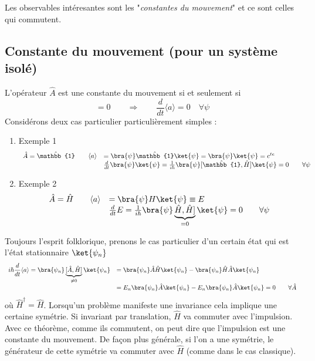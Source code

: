 	Les observables intéresantes sont les "\textit{constantes du mouvement}" et ce sont celles 
	qui commutent.

	\subsection{Constante du mouvement (pour un système isolé)}
	L'opérateur $\hat{A}$ est une constante du mouvement si et seulement si
	\begin{equation}
	[\hat{A},\hat{H}] = 0\qquad\Longrightarrow\qquad\dfrac{d}{dt}\langle a\rangle = 0\quad
	\forall \psi
	\end{equation}
	Considérons deux cas particulier particulièrement simples :
	\begin{enumerate}
	\item Exemple 1 \begin{equation}
	\begin{array}{ll}
	\hat{A} = \hat{\mathbb{1}}\qquad \langle a\rangle &= \bra{\psi}\hat{\mathbb{1}}\ket{\psi}=\bra{\psi}\ket{\psi} 
	= c^{te}\\
	& \frac{d}{dt}\bra{\psi}\ket{\psi} = \frac{1}{i\hbar}\bra{\psi}[\hat{\mathbb{1}},\hat{H}]\ket{\psi}=0\qquad 
	\forall \psi
	\end{array}
	\end{equation}
	\item Exemple 2 \begin{equation}
	\begin{array}{ll}
	\hat{A} = \hat{H}\qquad \langle a\rangle &= \bra{\psi}H\ket{\psi}\equiv E\\
	& \frac{d}{dt}E = \frac{1}{i\hbar}\bra{\psi}\underbrace{\hat{H},\hat{H}]}_{=0}\ket{\psi}=0\qquad 
	\forall \psi
	\end{array}
	\end{equation}
	\end{enumerate}
	Toujours l'esprit folklorique, prenons le cas particulier d'un certain état qui est l'état 
	stationnaire $\ket{\psi_n}$
	\begin{equation}
	\begin{array}{ll}
	i\hbar \dfrac{d}{dt}\langle a\rangle = \bra{\psi_n}\underbrace{[\hat{A},\hat{H}]}_{\neq 0}\ket{\psi_n} 
	&= \bra{\psi_n}\hat{A}\hat{H}\ket{\psi_n}-\bra{\psi_n}\hat{H}\hat{A}\ket{\psi_n}\\
	&= E_n \bra{\psi_n}\hat{A}\ket{\psi_n}-E_n\bra{\psi_n}\hat{A}\ket{\psi_n}=0\qquad \forall \hat{A}
	\end{array}
	\end{equation}
	où $\hat{H}^\dagger = \hat H$. Lorsqu'un problème manifeste une invariance cela implique une 
	certaine symétrie. Si invariant par translation, $\hat H$ va commuter avec l'impulsion. Avec 
	ce théorème, comme ils commutent, on peut dire que l'impulsion est une constante du mouvement.  
	De façon plus générale, si l'on a une symétrie, le générateur de cette symétrie va commuter 
	avec $\hat{H}$ (comme dans le cas classique).\\
	
